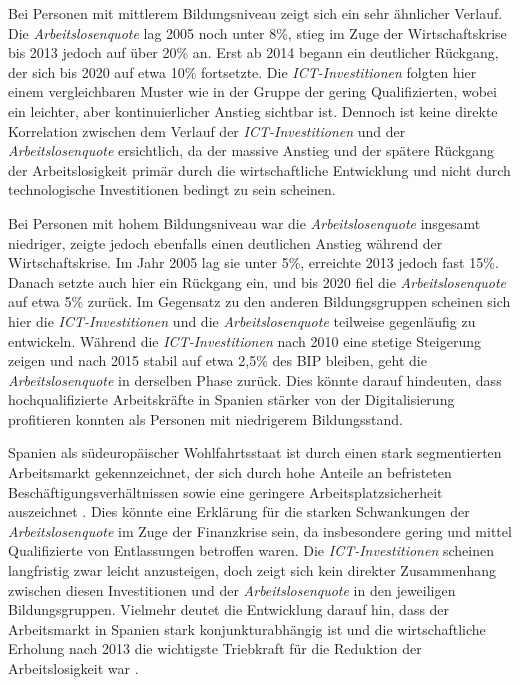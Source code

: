 Bei Personen mit mittlerem Bildungsniveau zeigt sich ein sehr ähnlicher Verlauf. Die 
\textit{Arbeitslosenquote} lag 2005 noch unter 8\%, stieg im Zuge der Wirtschaftskrise 
bis 2013 jedoch auf über 20\% an. Erst ab 2014 begann ein deutlicher Rückgang, der sich bis 
2020 auf etwa 10\% fortsetzte. Die \textit{\ac{ICT}-Investitionen} folgten hier einem 
vergleichbaren Muster wie in der Gruppe der gering Qualifizierten, wobei ein leichter, 
aber kontinuierlicher Anstieg sichtbar ist. Dennoch ist keine direkte Korrelation 
zwischen dem Verlauf der \textit{\ac{ICT}-Investitionen} und der \textit{Arbeitslosenquote}  
ersichtlich, da der massive Anstieg und der spätere Rückgang der Arbeitslosigkeit 
primär durch die wirtschaftliche Entwicklung und nicht durch technologische 
Investitionen bedingt zu sein scheinen.

Bei Personen mit hohem Bildungsniveau war die \textit{Arbeitslosenquote} insgesamt 
niedriger, zeigte jedoch ebenfalls einen deutlichen Anstieg während der Wirtschaftskrise. 
Im Jahr 2005 lag sie unter 5\%, erreichte 2013 jedoch fast 15\%. Danach setzte auch hier 
ein Rückgang ein, und bis 2020 fiel die \textit{Arbeitslosenquote} auf etwa 5\% zurück. Im 
Gegensatz zu den anderen Bildungsgruppen scheinen sich hier die 
\textit{\ac{ICT}-Investitionen} und die \textit{Arbeitslosenquote} teilweise gegenläufig zu 
entwickeln. Während die \textit{\ac{ICT}-Investitionen} nach 2010 eine stetige Steigerung 
zeigen und nach 2015 stabil auf etwa 2,5\% des BIP bleiben, geht die 
\textit{Arbeitslosenquote} in derselben Phase zurück. Dies könnte darauf hindeuten, dass 
hochqualifizierte Arbeitskräfte in Spanien stärker von der Digitalisierung profitieren 
konnten als Personen mit niedrigerem Bildungsstand.

Spanien als südeuropäischer Wohlfahrtsstaat ist durch einen stark segmentierten 
Arbeitsmarkt gekennzeichnet, der sich durch hohe Anteile an befristeten 
Beschäftigungsverhältnissen sowie eine geringere Arbeitsplatzsicherheit auszeichnet 
\parencite[vgl.][159–160]{bentolila2012two}. Dies könnte eine Erklärung für die starken 
Schwankungen der \textit{Arbeitslosenquote} im Zuge der Finanzkrise sein, da insbesondere 
gering und mittel Qualifizierte von Entlassungen betroffen waren. Die 
\textit{\ac{ICT}-Investitionen} scheinen langfristig zwar leicht anzusteigen, doch zeigt 
sich kein direkter Zusammenhang zwischen diesen Investitionen und der 
\textit{Arbeitslosenquote} in den jeweiligen Bildungsgruppen. Vielmehr deutet die 
Entwicklung darauf hin, dass der Arbeitsmarkt in Spanien stark konjunkturabhängig ist und 
die wirtschaftliche Erholung nach 2013 die wichtigste Triebkraft für die Reduktion der 
Arbeitslosigkeit war \parencite[vgl.][157–159]{bentolila2012two}.

